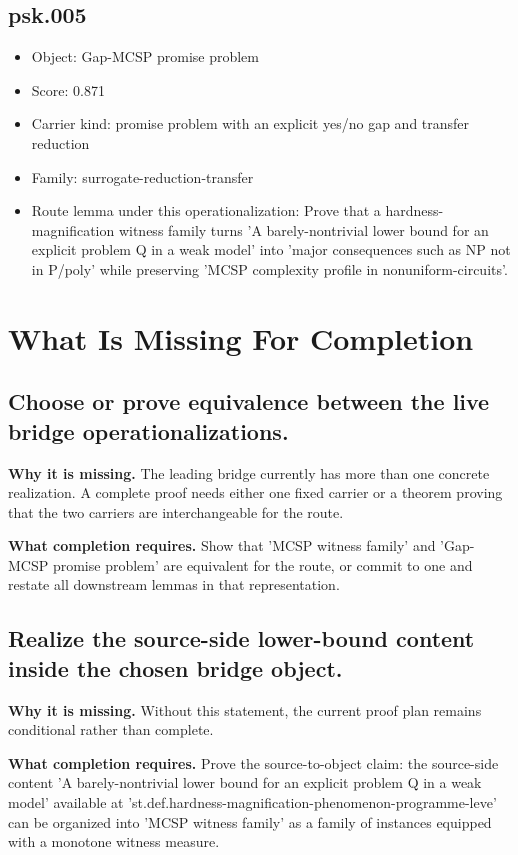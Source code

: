 \documentclass[11pt]{article}
\begin{document}
\subsection*{psk.005}
\begin{itemize}[leftmargin=*,itemsep=0.2em]
\item Object: Gap-MCSP promise problem
\item Score: 0.871
\item Carrier kind: promise problem with an explicit yes/no gap and transfer reduction
\item Family: surrogate-reduction-transfer
\item Route lemma under this operationalization: Prove that a hardness-magnification witness family turns 'A barely-nontrivial lower bound for an explicit problem Q in a weak model' into 'major consequences such as NP not in P/poly' while preserving 'MCSP complexity profile in nonuniform-circuits'.
\end{itemize}

\section{What Is Missing For Completion}
\subsection*{Choose or prove equivalence between the live bridge operationalizations.}
\textbf{Why it is missing.} The leading bridge currently has more than one concrete realization. A complete proof needs either one fixed carrier or a theorem proving that the two carriers are interchangeable for the route.

\textbf{What completion requires.} Show that 'MCSP witness family' and 'Gap-MCSP promise problem' are equivalent for the route, or commit to one and restate all downstream lemmas in that representation.
\subsection*{Realize the source-side lower-bound content inside the chosen bridge object.}
\textbf{Why it is missing.} Without this statement, the current proof plan remains conditional rather than complete.

\textbf{What completion requires.} Prove the source-to-object claim: the source-side content 'A barely-nontrivial lower bound for an explicit problem Q in a weak model' available at 'st.def.hardness-magnification-phenomenon-programme-leve' can be organized into 'MCSP witness family' as a family of instances equipped with a monotone witness measure.
\end{document}
